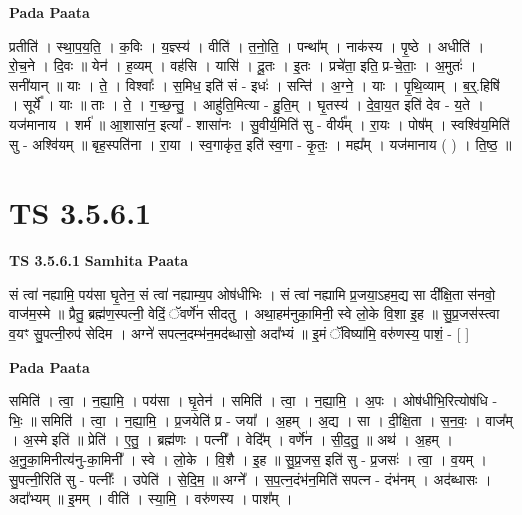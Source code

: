 \documentclass[17pt]{extarticle}
\begin{document}
\textbf{Pada Paata} \newline

प्रतीति॑ । स्था॒प॒य॒ति॒ । क॒विः । य॒ज्ञ्स्य॑ । वीति॑ । त॒नो॒ति॒ । पन्था᳚म् । नाक॑स्य । पृ॒ष्ठे । अधीति॑ । रो॒च॒ने । दि॒वः ॥ येन॑ । ह॒व्यम् । वह॑सि । यासि॑ । दू॒तः । इ॒तः । प्रचे॑ता॒ इति॒ प्र-चे॒ताः॒ । अ॒मुतः॑ । सनी॑यान् ॥ याः । ते॒ । विश्वाः᳚ । स॒मिध॒ इति॑ सं - इधः॑ । सन्ति॑ । अ॒ग्ने॒ । याः । पृ॒थि॒व्याम् । ब॒र्॒.हिषि॑ । सूर्ये᳚ । याः ॥ ताः । ते॒ । ग॒च्छ॒न्तु॒ । आहु॑ति॒मित्या - हु॒ति॒म् । घृ॒तस्य॑ । दे॒वा॒य॒त इति॑ देव - य॒ते । यज॑मानाय । शर्म॑ ॥ आ॒शासा॑न॒ इत्या᳚ - शासा॑नः । सु॒वीर्य॒मिति॑ सु - वीर्य᳚म् । रा॒यः । पोष᳚म् । स्वश्वि॑य॒मिति॑ सु - अश्वि॑यम् ॥ बृह॒स्पति॑ना । रा॒या । स्व॒गाकृ॑त॒ इति॑ स्व॒गा - कृ॒तः॒ । मह्य᳚म् । यज॑मानाय ( ) । ति॒ष्ठ॒ ॥  \newline





\section{ TS 3.5.6.1 }

\textbf{TS 3.5.6.1 } \newline
\textbf{Samhita Paata} \newline

सं त्वा॑ नह्यामि॒ पय॑सा घृ॒तेन॒ सं त्वा॑ नह्याम्य॒प ओष॑धीभिः । सं त्वा॑ नह्यामि प्र॒जया॒ऽहम॒द्य सा दी᳚क्षि॒ता स॑नवो॒ वाज॑म॒स्मे ॥ प्रैतु॒ ब्रह्म॑ण॒स्पत्नी॒ वेदिं॒ ॅवर्णे॑न सीदतु । अथा॒हम॑नुका॒मिनी॒ स्वे लो॒के वि॒शा इ॒ह ॥ सु॒प्र॒जस॑स्त्वा व॒यꣳ सु॒पत्नी॒रुप॑ सेदिम । अग्ने॑ सपत्न॒दम्भ॑न॒मद॑ब्धासो॒ अदा᳚भ्यं ॥ इ॒मं ॅविष्या॑मि॒ वरु॑णस्य॒ पाशं॒ - [  ] \newline

\textbf{Pada Paata} \newline

समिति॑ । त्वा॒ । न॒ह्या॒मि॒ । पय॑सा । घृ॒तेन॑ । समिति॑ । त्वा॒ । न॒ह्या॒मि॒ । अ॒पः । ओष॑धीभि॒रित्योष॑धि - भिः॒ ॥ समिति॑ । त्वा॒ । न॒ह्या॒मि॒ । प्र॒जयेति॑ प्र - जया᳚ । अ॒हम् । अ॒द्य । सा । दी॒क्षि॒ता । स॒न॒वः॒ । वाज᳚म् । अ॒स्मे इति॑ ॥ प्रेति॑ । ए॒तु॒ । ब्रह्म॑णः । पत्नी᳚ । वेदि᳚म् । वर्णे॑न । सी॒द॒तु॒ ॥ अथ॑ । अ॒हम् । अ॒नु॒का॒मिनीत्य॑नु-का॒मिनी᳚ । स्वे । लो॒के । वि॒शै । इ॒ह ॥ सु॒प्र॒जस॒ इति॑ सु - प्र॒जसः॑ । त्वा॒ । व॒यम् । सु॒पत्नी॒रिति॑ सु - पत्नीः᳚ । उपेति॑ । से॒दि॒म॒ ॥ अग्ने᳚ । स॒प॒त्न॒दंभ॑न॒मिति॑ सपत्न - दंभ॑नम् । अद॑ब्धासः । अदा᳚भ्यम् ॥ इ॒मम् । वीति॑ । स्या॒मि॒ । वरु॑णस्य । पाश᳚म् ।  \newline
\end{document}
